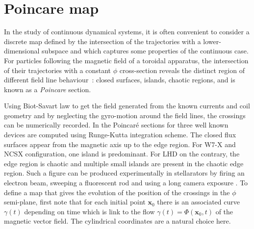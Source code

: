\chapter{Poincare map}
\newcommand{\dpmap}{\mathcal{D}\mathcal{P}}
\newcommand{\pmap}{\mathcal{P}}
\newcommand{\nfp}{n_\text{fp}}
\newcommand{\z}{z}

In the study of continuous dynamical systems, it is often convenient to consider a discrete map defined by the intersection of the trajectories with a lower-dimensional subspace and which captures some properties of the continuous case. For particles following the magnetic field of a toroidal apparatus, the intersection of their trajectories with a constant $\phi$ cross-section reveals the distinct region of different field line behaviour~: closed surfaces, islands, chaotic regions, and is known as a \textit{Poincare} section.




Using Biot-Savart law to get the field generated from the known currents and coil geometry and by neglecting the gyro-motion around the field lines, the crossings can be numerically recorded. In  the Poincaré sections for three well known devices are computed using Runge-Kutta integration scheme. The closed flux surfaces appear from the magnetic axis up to the edge region. For W7-X and NCSX configuration, one island is predominant. For LHD on the contrary, the edge region is chaotic and multiple small islands are present in the chaotic edge region. Such a figure can be produced experimentally in stellarators by firing an electron beam, sweeping a fluorescent rod and using a long camera exposure \cite{pedersen_confirmation_2016}. To define a map that gives the evolution of the position of the crossings in the $\phi$ semi-plane, first note that for each initial point $\textbf{x}_0$ there is an associated curve $\gamma(t)$ depending on time which is link to the flow $\gamma(t) = \Phi(\textbf{x}_0, t)$ of the magnetic vector field. The cylindrical coordinates are a natural choice here.

